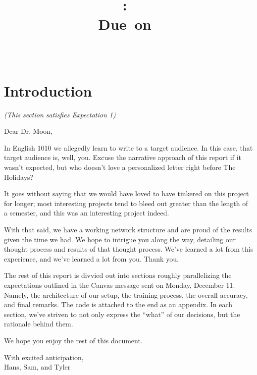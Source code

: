 \documentclass[11pt]{article}
\title{
\vspace{2in}
\textmd{\textbf{\hmwkClass:\ \hmwkTitle}}\\
\normalsize\vspace{0.1in}\small{Due\ on\ \hmwkDueDate}\\
\vspace{0.1in}\large{\textit{\hmwkClassInstructor\, \hmwkClassTime}}
\vspace{3in}
}
\author{\textbf{\hmwkAuthorName}}
\date{} %
\begin{document}
\maketitle



\newpage
\tableofcontents
\newpage



\section{Introduction}

\textit{(This section satisfies Expectation 1)}

Dear Dr. Moon,

In English 1010 we allegedly learn to write to a target audience. In this case, that target audience is, well, you. Excuse the narrative approach of this report if it wasn’t expected, but who doesn’t love a personalized letter right before The Holidays? 

It goes without saying that we would have loved to have tinkered on this project for longer; most interesting projects tend to bleed out greater than the length of a semester, and this was an interesting project indeed.

With that said, we have a working network structure and are proud of the results given the time we had. We hope to intrigue you along the way, detailing our thought process and results of that thought process. We’ve learned a lot from this experience, and we’ve learned a lot from you. Thank you.

The rest of this report is divvied out into sections roughly parallelizing the expectations outlined in the Canvas message sent on Monday, December 11. Namely, the architecture of our setup, the training process, the overall accuracy, and final remarks. The code is attached to the end as an appendix. In each section, we’ve striven to not only express the “what” of our decisions, but the rationale behind them.

We hope you enjoy the rest of this document.

\hfill
\parbox{5cm}{
\vspace{1.5cm}
With excited anticipation,\\[1.5cm]
Hans, Sam, and Tyler\\[1cm]
}
\end{document}
